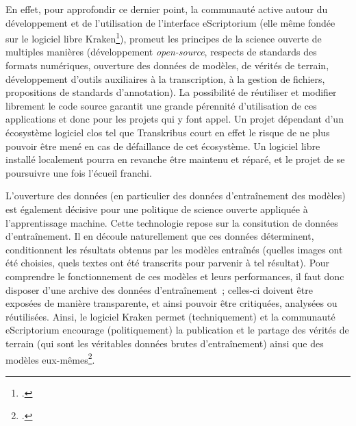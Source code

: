 \documentclass[a4paper,12pt,twoside]{book}
\begin{document}
				En effet, pour approfondir ce dernier point, la communauté active autour du développement et de l'utilisation de l'interface eScriptorium (elle même fondée sur le logiciel libre Kraken\footcite{KrakenDocumentation}), promeut les principes de la science ouverte de multiples manières (développement \textit{open-source}, respects de standards des formats numériques, ouverture des données de modèles, de vérités de terrain, développement d'outils auxiliaires à la transcription, à la gestion de fichiers, propositions de standards d'annotation). La possibilité de réutiliser et modifier librement le code source garantit une grande pérennité d'utilisation de ces applications et donc pour les projets qui y font appel. Un projet dépendant d'un écosystème logiciel clos tel que Transkribus court en effet le risque de ne plus pouvoir être mené en cas de défaillance de cet écosystème. Un logiciel libre installé localement pourra en revanche être maintenu et réparé, et le projet de se poursuivre une fois l'écueil franchi.
				
				L'ouverture des données (en particulier des données d'entraînement des modèles) est également décisive pour une politique de science ouverte appliquée à l'apprentissage machine. Cette technologie repose sur la consitution de données d'entraînement. Il en découle naturellement que ces données déterminent, conditionnent les résultats obtenus par les modèles entraînés (quelles images ont été choisies, quels textes ont été transcrits pour parvenir à tel résultat). Pour comprendre le fonctionnement de ces modèles et leurs performances, il faut donc disposer d'une archive des données d'entraînement~; celles-ci doivent être exposées de manière transparente, et ainsi pouvoir être critiquées, analysées ou réutilisées. Ainsi, le logiciel Kraken permet (techniquement) et la communauté eScriptorium encourage (politiquement) la publication et le partage des vérités de terrain (qui sont les véritables données brutes d'entraînement) ainsi que des modèles eux-mêmes\footcite{chagueHTRUnitedMutualisonsVerite2021}.
				
\end{document}
